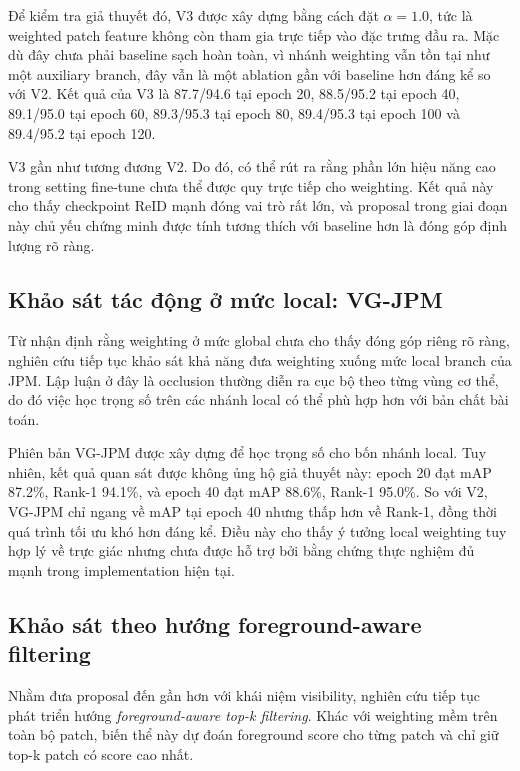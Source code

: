 Để kiểm tra giả thuyết đó, V3 được xây dựng bằng cách đặt \(\alpha = 1.0\), tức là weighted patch feature không còn tham gia trực tiếp vào đặc trưng đầu ra. Mặc dù đây chưa phải baseline sạch hoàn toàn, vì nhánh weighting vẫn tồn tại như một auxiliary branch, đây vẫn là một ablation gần với baseline hơn đáng kể so với V2. Kết quả của V3 là 87.7/94.6 tại epoch 20, 88.5/95.2 tại epoch 40, 89.1/95.0 tại epoch 60, 89.3/95.3 tại epoch 80, 89.4/95.3 tại epoch 100 và 89.4/95.2 tại epoch 120.

V3 gần như tương đương V2. Do đó, có thể rút ra rằng phần lớn hiệu năng cao trong setting fine-tune chưa thể được quy trực tiếp cho weighting. Kết quả này cho thấy checkpoint ReID mạnh đóng vai trò rất lớn, và proposal trong giai đoạn này chủ yếu chứng minh được tính tương thích với baseline hơn là đóng góp định lượng rõ ràng.

\subsection{Khảo sát tác động ở mức local: VG-JPM}

Từ nhận định rằng weighting ở mức global chưa cho thấy đóng góp riêng rõ ràng, nghiên cứu tiếp tục khảo sát khả năng đưa weighting xuống mức local branch của JPM. Lập luận ở đây là occlusion thường diễn ra cục bộ theo từng vùng cơ thể, do đó việc học trọng số trên các nhánh local có thể phù hợp hơn với bản chất bài toán.

Phiên bản VG-JPM được xây dựng để học trọng số cho bốn nhánh local. Tuy nhiên, kết quả quan sát được không ủng hộ giả thuyết này: epoch 20 đạt mAP 87.2\%, Rank-1 94.1\%, và epoch 40 đạt mAP 88.6\%, Rank-1 95.0\%. So với V2, VG-JPM chỉ ngang về mAP tại epoch 40 nhưng thấp hơn về Rank-1, đồng thời quá trình tối ưu khó hơn đáng kể. Điều này cho thấy ý tưởng local weighting tuy hợp lý về trực giác nhưng chưa được hỗ trợ bởi bằng chứng thực nghiệm đủ mạnh trong implementation hiện tại.

\subsection{Khảo sát theo hướng foreground-aware filtering}

Nhằm đưa proposal đến gần hơn với khái niệm visibility, nghiên cứu tiếp tục phát triển hướng \textit{foreground-aware top-k filtering}. Khác với weighting mềm trên toàn bộ patch, biến thể này dự đoán foreground score cho từng patch và chỉ giữ top-k patch có score cao nhất.

